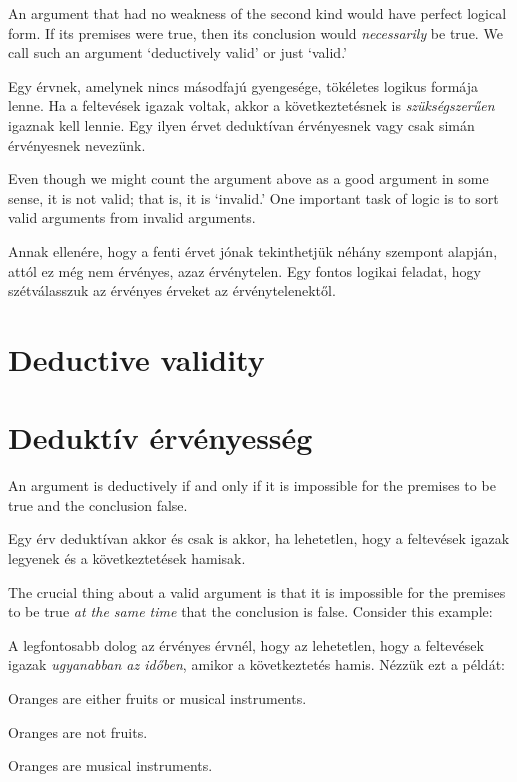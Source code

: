 An argument that had no weakness of the second kind would have perfect logical form. If its premises were true, then its conclusion would \emph{necessarily} be true. We call such an argument `deductively valid' or just `valid.'

Egy érvnek, amelynek nincs másodfajú gyengesége, tökéletes logikus formája lenne. Ha a feltevések igazak voltak, akkor a következtetésnek is \emph{szükségszerűen} igaznak kell lennie. Egy ilyen érvet deduktívan érvényesnek vagy csak simán érvényesnek nevezünk.

Even though we might count the argument above as a good argument in some sense, it is not valid; that is, it is `invalid.' One important task of logic is to sort valid arguments from invalid arguments.

Annak ellenére, hogy a fenti érvet jónak tekinthetjük néhány szempont alapján, attól ez még nem érvényes, azaz érvénytelen. Egy fontos logikai feladat, hogy szétválasszuk az érvényes érveket az érvénytelenektől.

\section*{Deductive validity}
\section{Deduktív érvényesség}
An argument is deductively  if and only if it is impossible for the premises to be true and the conclusion false.

Egy érv deduktívan  akkor és csak is akkor, ha lehetetlen, hogy a feltevések igazak legyenek és a következtetések hamisak.

The crucial thing about a valid argument is that it is impossible for the premises to be true \emph{at the same time} that the conclusion is false. Consider this example:

A legfontosabb dolog az érvényes érvnél, hogy az lehetetlen, hogy a feltevések igazak \emph{ugyanabban az időben}, amikor a következtetés hamis. Nézzük ezt a példát:

\begin{earg}
\item[] Oranges are either fruits or musical instruments.
\item[] Oranges are not fruits.
\item[\therefore] Oranges are musical instruments.
\end{earg}

